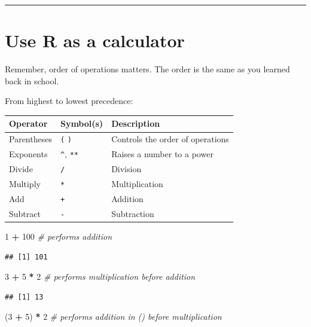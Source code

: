 \documentclass[
]{book}
\newenvironment{Shaded}{\begin{snugshade}}{\end{snugshade}}
\newcommand{\CommentTok}[1]{\textcolor[rgb]{0.56,0.35,0.01}{\textit{#1}}}
\newcommand{\DecValTok}[1]{\textcolor[rgb]{0.00,0.00,0.81}{#1}}
\newcommand{\NormalTok}[1]{#1}
\newcommand{\SpecialCharTok}[1]{\textcolor[rgb]{0.81,0.36,0.00}{\textbf{#1}}}
\begin{document}
\begin{center}\rule{0.5\linewidth}{0.5pt}\end{center}

\section{Use R as a calculator}\label{use-r-as-a-calculator}

Remember, order of operations matters. The order is the same as you learned back in school.

From highest to lowest precedence:

\begin{longtable}[]{@{}lll@{}}
\toprule\noalign{}
Operator & Symbol(s) & Description \\
\midrule\noalign{}
\endhead
\bottomrule\noalign{}
\endlastfoot
Parentheses & \texttt{(} \texttt{)} & Controls the order of operations \\
Exponents & \texttt{\^{}}, \texttt{**} & Raises a number to a power \\
Divide & \texttt{/} & Division \\
Multiply & \texttt{*} & Multiplication \\
Add & \texttt{+} & Addition \\
Subtract & \texttt{-} & Subtraction \\
\end{longtable}

\begin{Shaded}
\begin{Highlighting}[]
\DecValTok{1} \SpecialCharTok{+} \DecValTok{100} \CommentTok{\# performs addition}
\end{Highlighting}
\end{Shaded}

\begin{verbatim}
## [1] 101
\end{verbatim}

\begin{Shaded}
\begin{Highlighting}[]
\DecValTok{3} \SpecialCharTok{+} \DecValTok{5} \SpecialCharTok{*} \DecValTok{2} \CommentTok{\# performs multiplication before addition}
\end{Highlighting}
\end{Shaded}

\begin{verbatim}
## [1] 13
\end{verbatim}

\begin{Shaded}
\begin{Highlighting}[]
\NormalTok{(}\DecValTok{3} \SpecialCharTok{+} \DecValTok{5}\NormalTok{) }\SpecialCharTok{*} \DecValTok{2} \CommentTok{\# performs addition in () before multiplication }
\end{Highlighting}
\end{Shaded}
\end{document}
